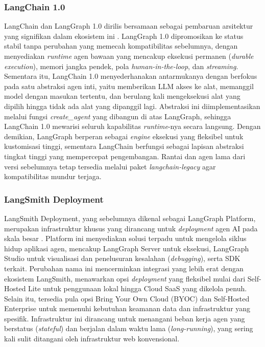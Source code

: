 \subsubsection{LangChain 1.0}

LangChain dan LangGraph 1.0 dirilis bersamaan sebagai pembaruan arsitektur yang signifikan dalam ekosistem ini \parencite{langchain2024alpha}. LangGraph 1.0 dipromosikan ke status stabil tanpa perubahan yang memecah kompatibilitas sebelumnya, dengan menyediakan \textit{runtime} agen bawaan yang mencakup eksekusi permanen (\textit{durable execution}), memori jangka pendek, pola \textit{human-in-the-loop}, dan \textit{streaming}. Sementara itu, LangChain 1.0 menyederhanakan antarmukanya dengan berfokus pada satu abstraksi agen inti, yaitu memberikan LLM akses ke alat, memanggil model dengan masukan tertentu, dan berulang kali mengeksekusi alat yang dipilih hingga tidak ada alat yang dipanggil lagi. Abstraksi ini diimplementasikan melalui fungsi \textit{create\_agent} yang dibangun di atas LangGraph, sehingga LangChain 1.0 mewarisi seluruh kapabilitas \textit{runtime}-nya secara langsung. Dengan demikian, LangGraph berperan sebagai \textit{engine} eksekusi yang fleksibel untuk kustomisasi tinggi, sementara LangChain berfungsi sebagai lapisan abstraksi tingkat tinggi yang mempercepat pengembangan. Rantai dan agen lama dari versi sebelumnya tetap tersedia melalui paket \textit{langchain-legacy} agar kompatibilitas mundur terjaga.

\subsubsection{LangSmith Deployment}
LangSmith Deployment, yang sebelumnya dikenal sebagai LangGraph Platform, merupakan infrastruktur khusus yang dirancang untuk \textit{deployment} agen AI pada skala besar \parencite{langchain2024langgraph}. Platform ini menyediakan solusi terpadu untuk mengelola siklus hidup aplikasi agen, mencakup LangGraph Server untuk eksekusi, LangGraph Studio untuk visualisasi dan penelusuran kesalahan (\textit{debugging}), serta SDK terkait. Perubahan nama ini mencerminkan integrasi yang lebih erat dengan ekosistem LangSmith, menawarkan opsi \textit{deployment} yang fleksibel mulai dari Self-Hosted Lite untuk penggunaan lokal hingga Cloud SaaS yang dikelola penuh. Selain itu, tersedia pula opsi Bring Your Own Cloud (BYOC) dan Self-Hosted Enterprise untuk memenuhi kebutuhan keamanan data dan infrastruktur yang spesifik. Infrastruktur ini dirancang untuk menangani beban kerja agen yang berstatus (\textit{stateful}) dan berjalan dalam waktu lama (\textit{long-running}), yang sering kali sulit ditangani oleh infrastruktur web konvensional.

